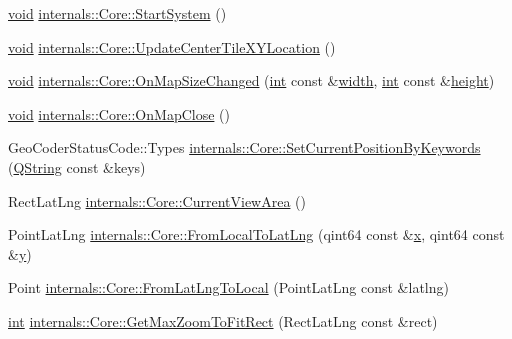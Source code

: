 \begin{DoxyCompactItemize}
\item 
\hyperlink{group___u_a_v_objects_plugin_ga444cf2ff3f0ecbe028adce838d373f5c}{void} \hyperlink{group___o_p_map_widget_gacc5971a73e9ba3ed87d97bf76e2c2e51}{internals\-::\-Core\-::\-Start\-System} ()
\item 
\hyperlink{group___u_a_v_objects_plugin_ga444cf2ff3f0ecbe028adce838d373f5c}{void} \hyperlink{group___o_p_map_widget_ga1c516d5c141339ebb623bd521e20edb6}{internals\-::\-Core\-::\-Update\-Center\-Tile\-X\-Y\-Location} ()
\item 
\hyperlink{group___u_a_v_objects_plugin_ga444cf2ff3f0ecbe028adce838d373f5c}{void} \hyperlink{group___o_p_map_widget_ga32b946b66a00213f725727696df9d9b4}{internals\-::\-Core\-::\-On\-Map\-Size\-Changed} (\hyperlink{ioapi_8h_a787fa3cf048117ba7123753c1e74fcd6}{int} const \&\hyperlink{glext_8h_a76aaa5c50746272e7d2de9aece921757}{width}, \hyperlink{ioapi_8h_a787fa3cf048117ba7123753c1e74fcd6}{int} const \&\hyperlink{glext_8h_ae23e72c69f79d0aa647aa7929ef3f232}{height})
\item 
\hyperlink{group___u_a_v_objects_plugin_ga444cf2ff3f0ecbe028adce838d373f5c}{void} \hyperlink{group___o_p_map_widget_ga10820264fc94dee4c279f60f6ed02309}{internals\-::\-Core\-::\-On\-Map\-Close} ()
\item 
Geo\-Coder\-Status\-Code\-::\-Types \hyperlink{group___o_p_map_widget_ga6fbdb5c07fae2a4400184e0c621ad750}{internals\-::\-Core\-::\-Set\-Current\-Position\-By\-Keywords} (\hyperlink{group___u_a_v_objects_plugin_gab9d252f49c333c94a72f97ce3105a32d}{Q\-String} const \&keys)
\item 
Rect\-Lat\-Lng \hyperlink{group___o_p_map_widget_ga228af41d307f46e0d759a52f0305d39a}{internals\-::\-Core\-::\-Current\-View\-Area} ()
\item 
Point\-Lat\-Lng \hyperlink{group___o_p_map_widget_gad6344ac56cefc8976c5bdf521b337a2f}{internals\-::\-Core\-::\-From\-Local\-To\-Lat\-Lng} (qint64 const \&\hyperlink{glext_8h_a1db9d104e3c2128177f26aff7b46982f}{x}, qint64 const \&\hyperlink{glext_8h_a42315f3ed8fff752bb47fd782309fcfc}{y})
\item 
Point \hyperlink{group___o_p_map_widget_ga8a2cc04c6bd69c306eaebe3df205f919}{internals\-::\-Core\-::\-From\-Lat\-Lng\-To\-Local} (Point\-Lat\-Lng const \&latlng)
\item 
\hyperlink{ioapi_8h_a787fa3cf048117ba7123753c1e74fcd6}{int} \hyperlink{group___o_p_map_widget_gaa75d239e869570eef0224e4e5654bd75}{internals\-::\-Core\-::\-Get\-Max\-Zoom\-To\-Fit\-Rect} (Rect\-Lat\-Lng const \&rect)
\item 

\end{DoxyCompactItemize}
